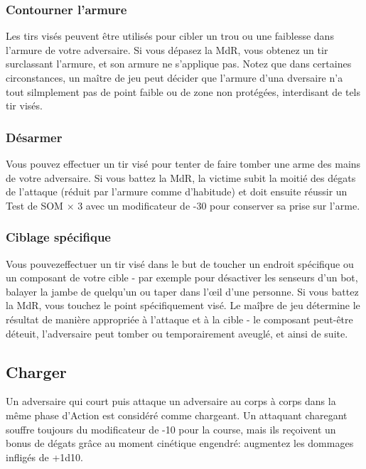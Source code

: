 \subsubsection{Contourner l'armure} 

Les tirs visés peuvent être utilisés pour cibler un trou ou une faiblesse dans l'armure de votre adversaire. Si vous dépasez la MdR, vous obtenez un tir surclassant l'armure, et son armure ne s'applique pas. Notez que dans certaines circonstances, un maître de jeu peut décider que l'armure d'una dversaire n'a tout silmplement pas de point faible ou de zone non protégées, interdisant de tels tir visés. 

\subsubsection{Désarmer} 

Vous pouvez effectuer un tir visé pour tenter de faire tomber une arme des mains de votre adversaire. Si vous battez la MdR, la victime subit la moitié des dégats de l'attaque (réduit par l'armure comme d'habitude) et doit ensuite réussir un Test de SOM $\times$ 3 avec un modificateur de -30 pour conserver sa prise sur l'arme. 

\subsubsection{Ciblage spécifique} 

Vous pouvezeffectuer un tir visé dans le but de toucher un endroit spécifique ou un composant de votre cible - par exemple pour désactiver les senseurs d'un bot, balayer la jambe de quelqu'un ou taper dans l'œil d'une personne. Si vous battez la MdR, vous touchez le point spécifiquement visé. Le maîþre de jeu détermine le résultat de manière appropriée à l'attaque et à la cible - le composant peut-être déteuit, l'adversaire peut tomber ou temporairement aveuglé, et ainsi de suite. 

\subsection{Charger} \label{sec:charging} 

Un adversaire qui court puis attaque un adversaire au corps à corps dans la même phase d'Action est considéré comme chargeant. Un attaquant charegant souffre toujours du modificateur de -10 pour la course, mais ils reçoivent un bonus de dégats grâce au moment cinétique engendré: augmentez les dommages infligés de +1d10. 

